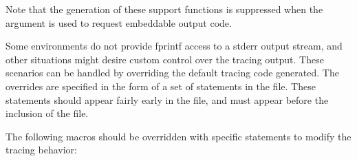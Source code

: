 Note that the generation of these support functions is suppressed when
the  argument is used to request embeddable output code.



Some environments do not provide fprintf access to a stderr output
stream, and other situations might desire custom control over the
tracing output.  These scenarios can be handled by overriding the
default tracing code generated.  The overrides are specified in the
form of a set of  statements in the  file.
These  statements should appear fairly early in the
 file, and must appear before the inclusion of the
 file.

The following macros should be overridden with specific 
statements to modify the tracing behavior:

